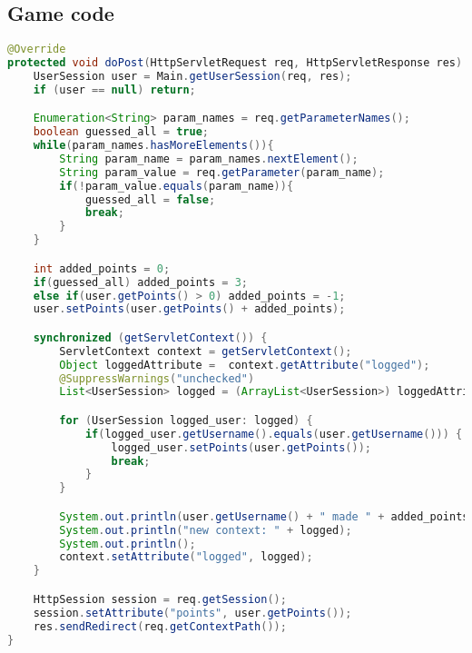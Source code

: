 \subsection{Game code}
\begin{lstlisting}[language=java, caption={POST method for game page}]
@Override
protected void doPost(HttpServletRequest req, HttpServletResponse res) throws IOException {
    UserSession user = Main.getUserSession(req, res);
    if (user == null) return;

    Enumeration<String> param_names = req.getParameterNames();
    boolean guessed_all = true;
    while(param_names.hasMoreElements()){
        String param_name = param_names.nextElement();
        String param_value = req.getParameter(param_name);
        if(!param_value.equals(param_name)){
            guessed_all = false;
            break;
        }
    }

    int added_points = 0;
    if(guessed_all) added_points = 3;
    else if(user.getPoints() > 0) added_points = -1;
    user.setPoints(user.getPoints() + added_points);

    synchronized (getServletContext()) {
        ServletContext context = getServletContext();
        Object loggedAttribute =  context.getAttribute("logged");
        @SuppressWarnings("unchecked")
        List<UserSession> logged = (ArrayList<UserSession>) loggedAttribute;

        for (UserSession logged_user: logged) {
            if(logged_user.getUsername().equals(user.getUsername())) {
                logged_user.setPoints(user.getPoints());
                break;
            }
        }

        System.out.println(user.getUsername() + " made " + added_points + " points");
        System.out.println("new context: " + logged);
        System.out.println();
        context.setAttribute("logged", logged);
    }

    HttpSession session = req.getSession();
    session.setAttribute("points", user.getPoints());
    res.sendRedirect(req.getContextPath());
}
\end{lstlisting}

